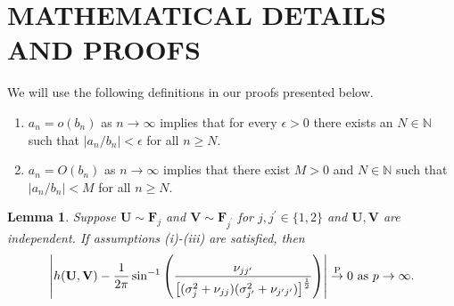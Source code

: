 \documentclass[twoside]{article}
\newcommand{\bF}{\mathbf{F}}
\newcommand{\bU}{\mathbf{U}}
\newcommand{\bV}{\mathbf{V}}
\newcommand{\0}{\mathbf{0}}
\newcommand{\1}{\mathbf{1}}
\numberwithin{equation}{section}
\newtheorem{lemma}[thm]{Lemma}
\begin{document}



\clearpage
\appendix
\thispagestyle{empty}
\onecolumn
\makesupplementtitle
\section{MATHEMATICAL DETAILS AND PROOFS}\label{supA}
We will use the following definitions in our proofs presented below.
\begin{enumerate}
 \item $a_n=o(b_n)$ as $n\to\infty$ implies that for every $\epsilon>0$ there exists an $N\in\mathbb{N}$ such that $|a_n/b_n|<\epsilon$ for all $n\geq N$.
 \item $a_n=O(b_n)$ as $n\to\infty$ implies that there exist $M>0$ and $N\in\mathbb{N}$ such that $|a_n/b_n|<M$ for all $n\geq N$.
\end{enumerate}
\vspace{0.5cm}
\begin{lemma}\label{C0}
Suppose $\bU\sim\bF_j$ and $\bV\sim\bF_{j^\prime}$ for $j,j^\prime\in\{1,2\}$ and $\bU,\bV$ are independent. If assumptions (i)-(iii) are satisfied, then $$\left |h(\bU,\bV)- \frac{1}{2\pi}\sin^{-1}\left (\frac{\nu_{jj^\prime}}{\big [(\sigma_j^2 + \nu_{jj})(\sigma_{j^\prime}^2 + \nu_{j^\prime j^\prime})\big ]^{\frac{1}{2}}}\right )\right |\stackrel{\rm P}{\to}0\text{ as }p\to\infty.$$
\end{lemma}
\end{document}
